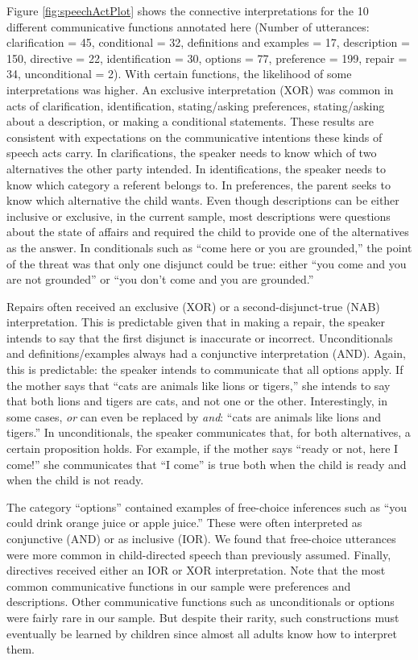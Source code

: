 \documentclass[
  english,
  ,man,floatsintext]{apa6}
\begin{document}
Figure \ref{fig:speechActPlot} shows the connective interpretations for the 10 different communicative functions annotated here (Number of utterances: clarification = 45, conditional = 32, definitions and examples = 17, description = 150, directive = 22, identification = 30, options = 77, preference = 199, repair = 34, unconditional = 2). With certain functions, the likelihood of some interpretations was higher. An exclusive interpretation (XOR) was common in acts of clarification, identification, stating/asking preferences, stating/asking about a description, or making a conditional statements. These results are consistent with expectations on the communicative intentions these kinds of speech acts carry. In clarifications, the speaker needs to know which of two alternatives the other party intended. In identifications, the speaker needs to know which category a referent belongs to. In preferences, the parent seeks to know which alternative the child wants. Even though descriptions can be either inclusive or exclusive, in the current sample, most descriptions were questions about the state of affairs and required the child to provide one of the alternatives as the answer. In conditionals such as ``come here or you are grounded,'' the point of the threat was that only one disjunct could be true: either ``you come and you are not grounded'' or ``you don't come and you are grounded.''

Repairs often received an exclusive (XOR) or a second-disjunct-true (NAB) interpretation. This is predictable given that in making a repair, the speaker intends to say that the first disjunct is inaccurate or incorrect. Unconditionals and definitions/examples always had a conjunctive interpretation (AND). Again, this is predictable: the speaker intends to communicate that all options apply. If the mother says that ``cats are animals like lions or tigers,'' she intends to say that both lions and tigers are cats, and not one or the other. Interestingly, in some cases, \emph{or} can even be replaced by \emph{and}: ``cats are animals like lions and tigers.'' In unconditionals, the speaker communicates that, for both alternatives, a certain proposition holds. For example, if the mother says ``ready or not, here I come!'' she communicates that ``I come'' is true both when the child is ready and when the child is not ready.

The category ``options'' contained examples of free-choice inferences such as ``you could drink orange juice or apple juice.'' These were often interpreted as conjunctive (AND) or as inclusive (IOR). We found that free-choice utterances were more common in child-directed speech than previously assumed. Finally, directives received either an IOR or XOR interpretation. Note that the most common communicative functions in our sample were preferences and descriptions. Other communicative functions such as unconditionals or options were fairly rare in our sample. But despite their rarity, such constructions must eventually be learned by children since almost all adults know how to interpret them.
\end{document}
